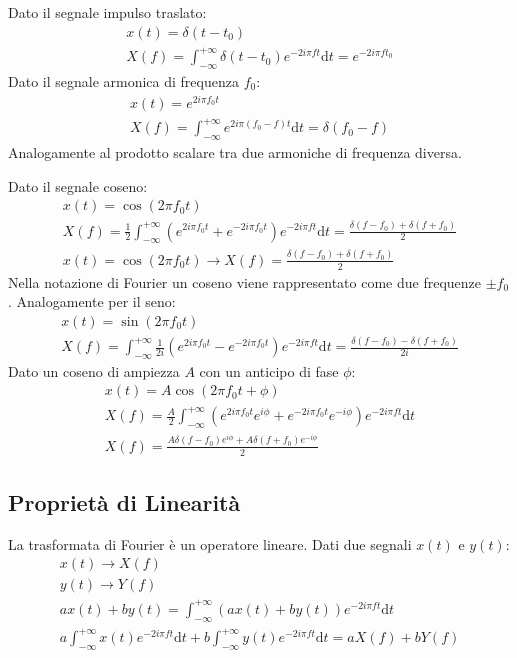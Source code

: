 \documentclass{article}
\newcommand{\df}{\mathrm{d}}
\numberwithin{equation}{subsection}
\begin{document}
Dato il segnale impulso traslato:
\begin{gather*}
    x(t)=\delta (t-t_0)\\
    X(f)=\displaystyle\int_{-\infty}^{+\infty}\delta(t-t_0)e^{-2i\pi ft}\df t=e^{-2i\pi ft_0}
\end{gather*}
Dato il segnale armonica di frequenza $f_0$:
\begin{gather*}
    x(t)=e^{2i\pi f_0t}\\
    X(f)=\displaystyle\int_{-\infty}^{+\infty}e^{2i\pi(f_0-f)t}\df t=\delta(f_0-f)
\end{gather*}
Analogamente al prodotto scalare tra due armoniche di frequenza diversa. 


Dato il segnale coseno:
\begin{gather*}
    x(t)=\cos(2\pi f_0t)\\
    X(f)=\displaystyle\frac{1}{2}\int_{-\infty}^{+\infty}\left(e^{2i\pi f_0t}+e^{-2i\pi f_0t}\right)e^{-2i\pi ft}\df t=\frac{\delta(f-f_0)+\delta(f+f_0)}{2}\\
    x(t)=\cos(2\pi f_0t)\rightarrow X(f)=\displaystyle\frac{\delta(f-f_0)+\delta(f+f_0)}{2}
\end{gather*}
Nella notazione di Fourier un coseno viene rappresentato come due frequenze $\pm f_0$. 
Analogamente per il seno:
\begin{gather*}
    x(t)=\sin(2\pi f_0t)\\
    X(f)=\displaystyle\int_{-\infty}^{+\infty}\frac{1}{2i}(e^{2i\pi f_0t}-e^{-2i\pi f_0t})e^{-2i\pi ft}\df t=\frac{\delta (f-f_0)-\delta(f+f_0)}{2i}
\end{gather*}
Dato un coseno di ampiezza $A$ con un anticipo di fase $\phi$: 
\begin{gather*}
    x(t)=A\cos(2\pi f_0t+\phi)\\
    X(f)=\displaystyle\frac{A}{2}\int_{-\infty}^{+\infty}\left(e^{2i\pi f_0t}e^{i\phi}+e^{-2i\pi f_0t}e^{-i\phi}\right)e^{-2i\pi ft}\df t\\
    X(f)=\frac{A\delta(f-f_0)e^{i\phi}+A\delta(f+f_0)e^{-i\phi}}{2}
\end{gather*}

\subsection{Proprietà di Linearità}

La trasformata di Fourier è un operatore lineare. Dati due segnali $x(t)$ e $y(t)$:
\begin{gather*}
    x(t)\to X(f)\\
    y(t)\to Y(f)\\
    ax(t)+by(t)=\displaystyle\int_{-\infty}^{+\infty}(ax(t)+by(t))e^{-2i\pi ft}\df t\\
    a\int_{-\infty}^{+\infty}x(t)e^{-2i\pi ft}\df t+b\int_{-\infty}^{+\infty}y(t)e^{-2i\pi ft}\df t= 
    aX(f)+bY(f)
\end{gather*}
\end{document}
